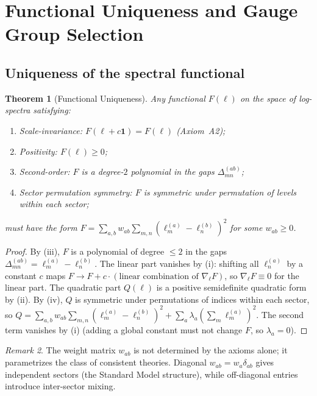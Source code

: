 \documentclass[12pt]{article}
\newtheorem{theorem}{Theorem}[section]
\theoremstyle{definition}
\theoremstyle{remark}
\newtheorem{remark}[theorem]{Remark}
\begin{document}
\section{Functional Uniqueness and Gauge Group Selection}
\label{sec:uniqueness}

\subsection{Uniqueness of the spectral functional}

\begin{theorem}[Functional Uniqueness]\label{thm:uniqueness}
Any functional $F(\ell)$ on the space of log-spectra satisfying:
\begin{enumerate}
\item[\textup{(i)}] \emph{Scale-invariance:} $F(\ell + c\mathbf{1}) = F(\ell)$
  \textup{(Axiom~A2)};
\item[\textup{(ii)}] \emph{Positivity:} $F(\ell) \geq 0$;
\item[\textup{(iii)}] \emph{Second-order:} $F$ is a degree-$2$ polynomial
  in the gaps $\Delta_{mn}^{(ab)}$;
\item[\textup{(iv)}] \emph{Sector permutation symmetry:} $F$ is symmetric
  under permutation of levels within each sector;
\end{enumerate}
must have the form $F = \sum_{a,b} w_{ab} \sum_{m,n} (\ell_m^{(a)} - \ell_n^{(b)})^2$
for some $w_{ab} \geq 0$.
\end{theorem}

\begin{proof}
By (iii), $F$ is a polynomial of degree $\leq 2$ in the gaps $\Delta_{mn}^{(ab)} = \ell_m^{(a)} - \ell_n^{(b)}$.
The linear part vanishes by (i): shifting all $\ell_n^{(a)}$ by a constant $c$ maps
$F \to F + c \cdot (\text{linear combination of } \nabla_\ell F)$, so $\nabla_\ell F\equiv 0$ for
the linear part.  The quadratic part $Q(\ell)$ is a positive semidefinite quadratic form
by (ii).  By (iv), $Q$ is symmetric under permutations of indices within each sector,
so $Q = \sum_{a,b} w_{ab} \sum_{m,n} (\ell_m^{(a)} - \ell_n^{(b)})^2 + \sum_a \lambda_a (\sum_m \ell_m^{(a)})^2$.
The second term vanishes by (i) (adding a global constant must not change $F$, so $\lambda_a = 0$).
\end{proof}

\begin{remark}
The weight matrix $w_{ab}$ is not determined by the axioms alone; it parametrizes
the class of consistent theories.  Diagonal $w_{ab} = w_a\delta_{ab}$ gives
independent sectors (the Standard Model structure), while off-diagonal entries
introduce inter-sector mixing.
\end{remark}
\end{document}
